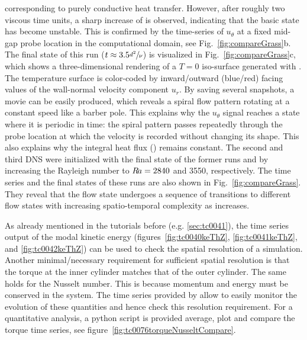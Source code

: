\documentclass[a4paper, 11pt, DIV=11]{scrartcl}
\begin{document}
corresponding to purely conductive heat transfer. However, after roughly two
viscous time units, a sharp increase of \Nui is observed, indicating that the
basic state has become unstable. This is confirmed by the time-series of
$u_{\theta}$ at a fixed mid-gap probe location in the computational domain, see
Fig.~\ref{fig:compareGrass}b. The final state of this run
($t\approx\num{3.5}\sfrac{d^2}{\nu}$) is visualized in
Fig.~\ref{fig:compareGrass}c, which shows a three-dimensional rendering of a
$T=0$ iso-surface generated with . The temperature surface is
color-coded by inward/outward (blue/red) facing values of the wall-normal
velocity component $u_r$. By saving several snapshots, a movie can be easily
produced, which reveals a spiral flow pattern rotating at a constant speed
like a barber pole. This explains why the $u_{\theta}$ signal reaches a state
where it is periodic in time: the spiral pattern passes repeatedly through the
probe location at which the velocity is recorded without changing its shape.
This also explains why the integral heat flux (\Nui) remains constant. The
second and third DNS were initialized with the final state of the former runs
and by increasing the Rayleigh number to $R\hspace{-0.1em}a=\num{2840}$ and \num{3550},
respectively. The time series and the final states of these runs are also
shown in Fig.~\ref{fig:compareGrass}. They reveal that the flow state undergoes a
sequence of transitions to different flow states with increasing
spatio-temporal complexity as \Rayleigh increases.
\par
As already mentioned in the tutorials before (e.g. \ref{sec:tc0041}),
the time series output of the modal kinetic energy (figures~\ref{fig:tc0040keThZ},
\ref{fig:tc0041keThZ}, and \ref{fig:tc0042keThZ}) can be used to check the
spatial resolution of a simulation. Another minimal/necessary requirement
for sufficient spatial resolution is that the torque at the inner cylinder
matches that of the outer cylinder. The same holds for the Nusselt number.
This is because momentum and energy must be conserved in the system.
The time series provided by \nsc allow to easily monitor the
evolution of these quantities and hence check this resolution requirement.
For a quantitative analysis, a python script is provided average, plot and
compare the torque time series, see figure~\ref{fig:tc0076torqueNusseltCompare}.
\end{document}
